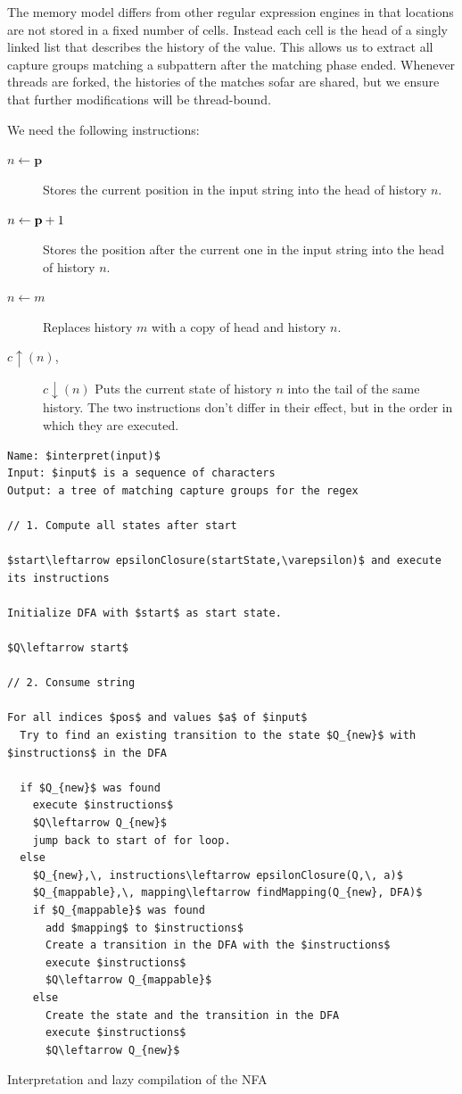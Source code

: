 \documentclass[english]{sigplanconf}
\theoremstyle{definition}
\begin{document}
The memory model differs from other regular expression engines in
that locations are not stored in a fixed number of cells. Instead
each cell is the head of a singly linked list that describes the history
of the value. This allows us to extract all capture groups matching
a subpattern after the matching phase ended. Whenever threads are
forked, the histories of the matches sofar are shared, but we ensure
that further modifications will be thread-bound.

We need the following instructions:
\begin{description}
\item [{$n\leftarrow\mathbf{p}$}] Stores the current position in the input
string into the head of history $n$.
\item [{$n\leftarrow\mathbf{\mathbf{p}}+1$}] Stores the position after the current one
in the input string into the head of history $n$.
\item [{$n\leftarrow m$}] Replaces history $m$ with a copy of
head and history $n$.
\item [{$c\uparrow(n)$,}] $c\downarrow(n)$ Puts the current state of
history $n$ into the tail of the same history. The
two instructions don't differ in their effect, but in the order in
which they are executed.
\end{description}
\begin{algorithm*}[tb]
\begin{lstlisting}[mathescape]
Name: $interpret(input)$
Input: $input$ is a sequence of characters
Output: a tree of matching capture groups for the regex

// 1. Compute all states after start

$start\leftarrow epsilonClosure(startState,\varepsilon)$ and execute its instructions

Initialize DFA with $start$ as start state.

$Q\leftarrow start$

// 2. Consume string

For all indices $pos$ and values $a$ of $input$
  Try to find an existing transition to the state $Q_{new}$ with $instructions$ in the DFA

  if $Q_{new}$ was found
    execute $instructions$
    $Q\leftarrow Q_{new}$
    jump back to start of for loop.
  else
    $Q_{new},\, instructions\leftarrow epsilonClosure(Q,\, a)$
    $Q_{mappable},\, mapping\leftarrow findMapping(Q_{new}, DFA)$
    if $Q_{mappable}$ was found
      add $mapping$ to $instructions$
      Create a transition in the DFA with the $instructions$
      execute $instructions$
      $Q\leftarrow Q_{mappable}$
    else
      Create the state and the transition in the DFA
      execute $instructions$
      $Q\leftarrow Q_{new}$
\end{lstlisting}
\caption{Interpretation and lazy compilation of the NFA}
\end{algorithm*}
\end{document}
